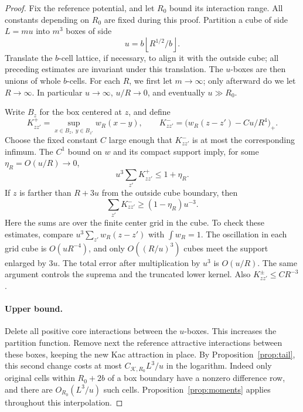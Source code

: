 \begin{proof}
Fix the reference potential, and let \(R_0\) bound its interaction range.
All constants depending on \(R_0\) are fixed during this proof.  Partition
a cube of side \(L=mu\) into \(m^3\) boxes of side
\[
 u=b\left\lfloor R^{1/2}/b\right\rfloor.
\]
Translate the \(b\)-cell lattice, if necessary, to align it with the
outside cube; all preceding estimates are invariant under this
translation.  The \(u\)-boxes are then unions of whole \(b\)-cells.
For each \(R\), we
first let \(m\to\infty\); only afterward do we let \(R\to\infty\).
In particular \(u\to\infty\), \(u/R\to0\), and eventually \(u\gg R_0\).

Write \(B_z\) for the box centered at \(z\), and define
\[
 K^+_{zz'}=\sup_{x\in B_z,\ y\in B_{z'}}w_R(x-y),
 \qquad
 K^-_{zz'}=\bigl(w_R(z-z')-Cu/R^4\bigr)_+.
\]
Choose the fixed constant \(C\) large enough that \(K^-_{zz'}\) is at most
the corresponding infimum.  The \(C^1\) bound on \(w\) and its compact
support imply, for some \(\eta_R=O(u/R)\to0\),
\begin{equation}\label{eq:kac-rows}
 u^3\sum_{z'}K^+_{zz'}\le1+\eta_R.
\end{equation}
If \(z\) is farther than \(R+3u\) from the outside cube boundary, then
\begin{equation}\label{eq:kac-lower-row}
 \sum_{z'}K^-_{zz'}\ge(1-\eta_R)u^{-3}.
\end{equation}
Here the sums are over the finite center grid in the cube.  To check these
estimates, compare \(u^3\sum_{z'}w_R(z-z')\) with \(\int w_R=1\).
The oscillation in each grid cube is \(O(uR^{-4})\), and only
\(O((R/u)^3)\) cubes meet the support enlarged by \(3u\).  The total
error after multiplication by \(u^3\) is \(O(u/R)\).
The same argument controls the suprema and the truncated lower kernel.
Also \(K^\pm_{zz'}\le C R^{-3}\).

\paragraph{Upper bound.}
Delete all positive core interactions between the \(u\)-boxes.  This
increases the partition function.  Remove next the reference attractive
interactions between these boxes, keeping the new Kac attraction in
place.  By Proposition~\ref{prop:tail}, this second change costs at most
\(C_{\mathcal K,R_0}L^3/u\) in the logarithm.  Indeed only original cells
within \(R_0+2b\) of a box boundary have a nonzero difference row, and
there are \(O_{R_0}(L^3/u)\) such cells.  Proposition~\ref{prop:moments}
applies throughout this interpolation.


\end{proof}
